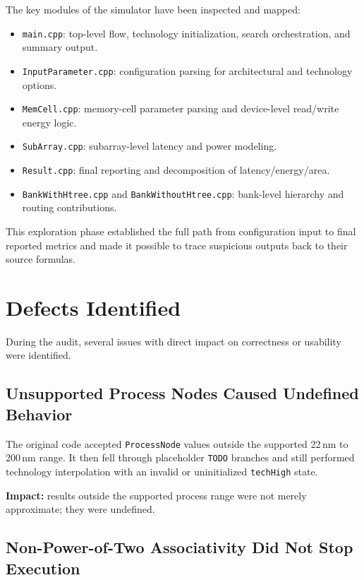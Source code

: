 \documentclass[11pt]{article}
\begin{document}
The key modules of the simulator have been inspected and mapped:

\begin{itemize}[leftmargin=1.5em]
    \item \texttt{main.cpp}: top-level flow, technology initialization, search orchestration, and summary output.
    \item \texttt{InputParameter.cpp}: configuration parsing for architectural and technology options.
    \item \texttt{MemCell.cpp}: memory-cell parameter parsing and device-level read/write energy logic.
    \item \texttt{SubArray.cpp}: subarray-level latency and power modeling.
    \item \texttt{Result.cpp}: final reporting and decomposition of latency/energy/area.
    \item \texttt{BankWithHtree.cpp} and \texttt{BankWithoutHtree.cpp}: bank-level hierarchy and routing contributions.
\end{itemize}

This exploration phase established the full path from configuration input to final reported metrics and made it possible to trace suspicious outputs back to their source formulas.

\section{Defects Identified}

During the audit, several issues with direct impact on correctness or usability were identified.

\subsection{Unsupported Process Nodes Caused Undefined Behavior}

The original code accepted \texttt{ProcessNode} values outside the supported 22\,nm to 200\,nm range. It then fell through placeholder \texttt{TODO} branches and still performed technology interpolation with an invalid or uninitialized \texttt{techHigh} state.

\textbf{Impact:} results outside the supported process range were not merely approximate; they were undefined.

\subsection{Non-Power-of-Two Associativity Did Not Stop Execution}
\end{document}
